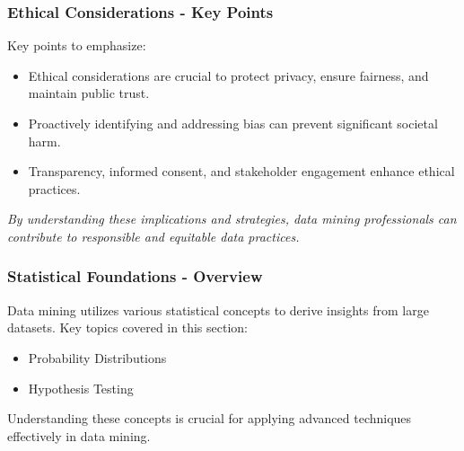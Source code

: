 \documentclass{beamer}
\begin{document}
\begin{frame}[fragile]
    \frametitle{Ethical Considerations - Key Points}
    Key points to emphasize:
    
    \begin{itemize}
        \item Ethical considerations are crucial to protect privacy, ensure fairness, and maintain public trust.
        \item Proactively identifying and addressing bias can prevent significant societal harm.
        \item Transparency, informed consent, and stakeholder engagement enhance ethical practices.
    \end{itemize}

    \vspace{1em}
    \textit{By understanding these implications and strategies, data mining professionals can contribute to responsible and equitable data practices.}
\end{frame}

\begin{frame}[fragile]
    \frametitle{Statistical Foundations - Overview}
    Data mining utilizes various statistical concepts to derive insights from large datasets. Key topics covered in this section:
    \begin{itemize}
        \item Probability Distributions
        \item Hypothesis Testing
    \end{itemize}
    Understanding these concepts is crucial for applying advanced techniques effectively in data mining.
\end{frame}
\end{document}
